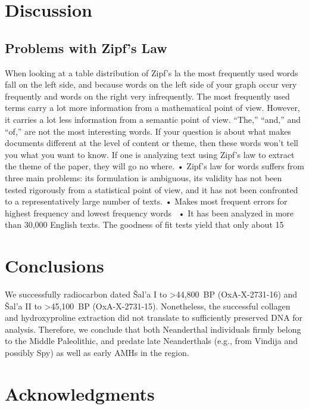 \documentclass[a4paper,10pt]{article}
\begin{document}
\section{Discussion}

\subsection{Problems with Zipf's Law}

When looking at a table distribution of Zipf’s la the most frequently used words fall on the left side, and because words on the left side of your graph occur very frequently and words on the right very infrequently. The most frequently used terms carry a lot more information from a mathematical point of view. However, it carries a lot less information from a semantic point of view. “The,” “and,” and “of,” are not the most interesting words. If your question is about what makes documents different at the level of content or theme, then these words won’t tell you what you want to know. If one is analyzing text using Zipf’s law to extract the theme of the paper, they will go no where. 
• Zipf's law for words suffers from three main problems: its formulation is ambiguous, its validity has not been tested rigorously from a statistical point of view, and it has not been confronted to a representatively large number of texts.
• Makes most frequent errors for highest frequency and lowest frequency words 
• It has been analyzed in more than 30,000 English texts. The goodness of fit tests yield that only about 15%


\section{Conclusions}

We successfully radiocarbon dated Šal'a I to >44,800~BP (OxA-X-2731-16) and Šal'a II to >45,100~BP (OxA-X-2731-15). Nonetheless, the successful collagen and hydroxyproline extraction did not translate to sufficiently preserved DNA for analysis. Therefore, we conclude that both Neanderthal individuals firmly belong to the Middle Paleolithic, and predate late Neanderthals (e.g., from Vindija and possibly Spy) as well as early AMHs in the region.


\section*{Acknowledgments}
\end{document}
